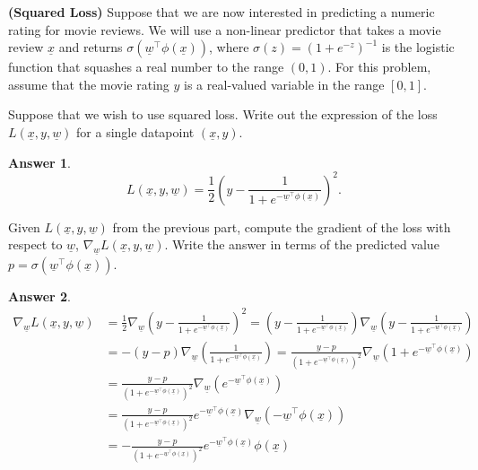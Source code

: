 \documentclass{article}
\renewcommand{\vec}[1]{\underline{#1}}
\newcommand{\vecw}{\vec{w}}
\theoremstyle{definition}
\newtheorem*{answer}{Answer}
\begin{document}
\begin{question}
	\item \textbf{(Squared Loss)} Suppose that we are now interested in predicting a numeric rating for movie reviews. We will use a non-linear predictor that takes a movie review $\underline{x}$ and returns $\sigma(\underline{w}^\top\phi(\underline{x}))$, where $\sigma(z)=(1+e^{-z})^{-1}$ is the logistic function that squashes a real number to the range $(0,1)$. For this problem, assume that the movie rating $y$ is a real-valued variable in the range $[0,1]$.
	\begin{question}
		\item Suppose that we wish to use squared loss. Write out the expression of the loss $L(\underline{x},y,\underline{w})$ for a single datapoint $(\underline{x},y)$.
		\begin{answer}
			~
			\begin{equation*}
				L(\underline{x},y,\vecw) = \frac{1}{2}\left(y - \frac{1}{1+e^{-\vecw^\top\phi(\underline{x})}}\right)^2.
			\end{equation*}
		\end{answer}
		\item Given $L(\underline{x},y,\underline{w})$ from the previous part, compute the gradient of the loss with respect to $\underline{w}$, $\nabla_{\underline{w}}L(\underline{x},y,\underline{w})$. Write the answer in terms of the predicted value $p=\sigma(\underline{w}^\top\phi(\underline{x}))$.
		\begin{answer}
			~
			\begin{align*}
				\nabla_{\underline{w}}L(\underline{x},y,\underline{w}) &= \frac{1}{2}\nabla_{\underline{w}}\left(y - \frac{1}{1+e^{-\vecw^\top\phi(\underline{x})}}\right)^2 = \left(y - \frac{1}{1+e^{-\vecw^\top\phi(\underline{x})}}\right)\nabla_{\underline{w}}\left(y - \frac{1}{1+e^{-\vecw^\top\phi(\underline{x})}}\right)\\
				&=-(y-p)\nabla_{\underline{w}}\left(\frac{1}{1+e^{-\vecw^\top\phi(\underline{x})}}\right)=\frac{y-p}{\left(1+e^{-\vecw^\top\phi(\underline{x})}\right)^2}\nabla_{\underline{w}}\left(1+e^{-\vecw^\top\phi(\underline{x})} \right)\\
				&=\frac{y-p}{\left(1+e^{-\vecw^\top\phi(\underline{x})}\right)^2}\nabla_{\underline{w}}\left(e^{-\vecw^\top\phi(\underline{x})} \right)\\
				&=\frac{y-p}{\left(1+e^{-\vecw^\top\phi(\underline{x})}\right)^2} e^{-\vecw^\top\phi(\underline{x})}\nabla_{\underline{w}}\left({-\vecw^\top\phi(\underline{x})} \right)\\
				&=-\frac{y-p}{\left(1+e^{-\vecw^\top\phi(\underline{x})}\right)^2} e^{-\vecw^\top\phi(\underline{x})}\phi(\underline{x})\\

\end{align*}
\end{answer}
\end{question}
\end{question}
\end{document}
